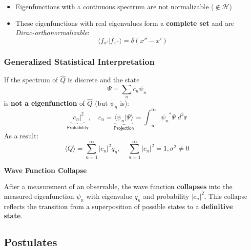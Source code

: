 \newpar{}
\begin{itemize}
    \item Eigenfunctions with a continuous spectrum are not normalizable ($\notin \mathcal{H}$)
    \item These eigenfunctions with real eigenvalues form a \textbf{complete set} and are \textit{Dirac-orthonormalizable}:
          \noindent\begin{equation*}
              \langle f_{x'}|f_{x''}\rangle=\delta(x''-x')
          \end{equation*}
\end{itemize}

\subsubsection{Generalized Statistical Interpretation}\label{midterm:gen_stat}
If the spectrum of $\hat{Q}$ is discrete and the state
\begin{equation*}
    \Psi=\sum_n c_n \psi_n
\end{equation*}
is \textbf{not a eigenfunction} of $\hat{Q}$ (but $\psi_n$ is):
\noindent\begin{equation*}
    \underbrace{|c_n|^2}_{\textsf{Probability}}, \quad c_n = \underbrace{\langle \psi_n|\Psi\rangle}_{\textsf{Projection}} =\int_{-\infty}^{\infty} {\psi_n}^* \Psi\; d^3 \mathbf{r}
\end{equation*}
As a result:
\noindent\begin{equation*}
    \langle Q\rangle  = \sum_{n=1}^{\infty} |c_n|^2 q_n, \quad  \sum_{n=1}^{\infty} |c_n|^2 = 1, \sigma^2          \neq 0
\end{equation*}

\textbf{Wave Function Collapse}

After a measurement of an observable, the wave function \textbf{collapses} into the measured eigenfunction $\psi_n$ with eigenvalue $q_n$ and probability $|c_n|^2$. This collapse reflects the transition from a superposition of possible states to a \textbf{definitive state}.

\subsection{Postulates}

